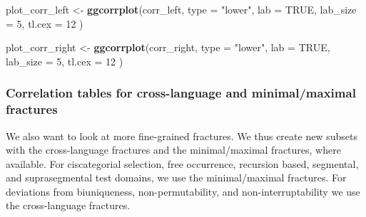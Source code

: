 \documentclass[
]{article}
\newenvironment{Shaded}{\begin{snugshade}}{\end{snugshade}}
\newcommand{\AttributeTok}[1]{\textcolor[rgb]{0.13,0.29,0.53}{#1}}
\newcommand{\ConstantTok}[1]{\textcolor[rgb]{0.56,0.35,0.01}{#1}}
\newcommand{\DecValTok}[1]{\textcolor[rgb]{0.00,0.00,0.81}{#1}}
\newcommand{\FunctionTok}[1]{\textcolor[rgb]{0.13,0.29,0.53}{\textbf{#1}}}
\newcommand{\NormalTok}[1]{#1}
\newcommand{\OtherTok}[1]{\textcolor[rgb]{0.56,0.35,0.01}{#1}}
\newcommand{\StringTok}[1]{\textcolor[rgb]{0.31,0.60,0.02}{#1}}
\begin{document}
\begin{Shaded}
\begin{Highlighting}[]
\NormalTok{plot\_corr\_left }\OtherTok{\textless{}{-}} \FunctionTok{ggcorrplot}\NormalTok{(corr\_left,}
  \AttributeTok{type =} \StringTok{"lower"}\NormalTok{,}
  \AttributeTok{lab =} \ConstantTok{TRUE}\NormalTok{,}
  \AttributeTok{lab\_size =} \DecValTok{5}\NormalTok{,}
  \AttributeTok{tl.cex =} \DecValTok{12}
\NormalTok{)}

\NormalTok{plot\_corr\_right }\OtherTok{\textless{}{-}} \FunctionTok{ggcorrplot}\NormalTok{(corr\_right,}
  \AttributeTok{type =} \StringTok{"lower"}\NormalTok{,}
  \AttributeTok{lab =} \ConstantTok{TRUE}\NormalTok{,}
  \AttributeTok{lab\_size =} \DecValTok{5}\NormalTok{,}
  \AttributeTok{tl.cex =} \DecValTok{12}
\NormalTok{)}
\end{Highlighting}
\end{Shaded}

\subsubsection{Correlation tables for cross-language and minimal/maximal
fractures}\label{correlation-tables-for-cross-language-and-minimalmaximal-fractures}

We also want to look at more fine-grained fractures. We thus create new
subsets with the cross-language fractures and the minimal/maximal
fractures, where available. For ciscategorial selection, free
occurrence, recursion based, segmental, and suprasegmental test domains,
we use the minimal/maximal fractures. For deviations from biuniqueness,
non-permutability, and non-interruptability we use the cross-language
fractures.
\end{document}
